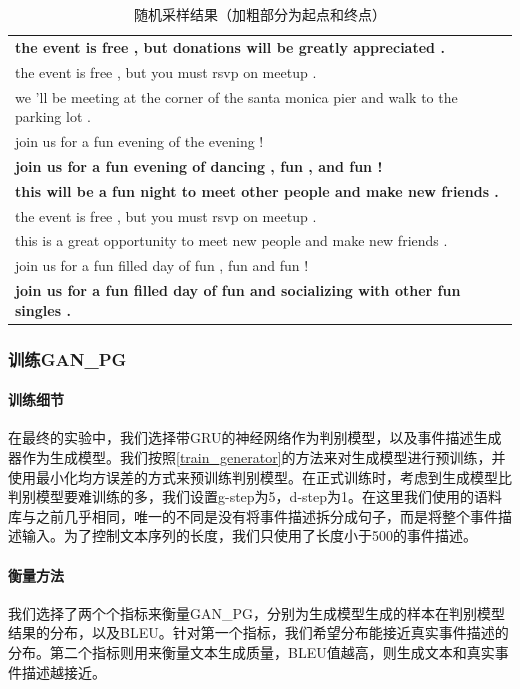 \begin{table}[htbp]
    \center
    \caption{\label{t3-3}随机采样结果（加粗部分为起点和终点）}
    \begin{tabular*}{\linewidth}{p{\linewidth}}
\toprule
\textbf{the event is free , but donations will be greatly appreciated .}\\
the event is free , but you must rsvp on meetup . \\
we 'll be meeting at the corner of the santa monica pier and walk to the parking lot .\\
join us for a fun evening of the evening !\\
\textbf{join us for a fun evening of dancing , fun , and fun !}\\
\midrule
\textbf{this will be a fun night to meet other people and make new friends .}\\
the event is free , but you must rsvp on meetup . \\
this is a great opportunity to meet new people and make new friends .\\
join us for a fun filled day of fun , fun and fun ! \\
\textbf{join us for a fun filled day of fun and socializing with other fun singles . }\\
\bottomrule
    \end{tabular*}
\end{table}

\subsubsection{训练GAN\_PG}
\paragraph{训练细节}
在最终的实验中，我们选择带GRU的神经网络作为判别模型，以及事件描述生成器作为生成模型。我们按照\ref{train_generator}的方法来对生成模型进行预训练，并使用最小化均方误差的方式来预训练判别模型。在正式训练时，考虑到生成模型比判别模型要难训练的多，我们设置g-step为5，d-step为1。在这里我们使用的语料库与之前几乎相同，唯一的不同是没有将事件描述拆分成句子，而是将整个事件描述输入。为了控制文本序列的长度，我们只使用了长度小于500的事件描述。
\paragraph{衡量方法}
我们选择了两个个指标来衡量GAN\_PG，分别为生成模型生成的样本在判别模型结果的分布，以及BLEU\cite{papineni_bleu:_2002}。针对第一个指标，我们希望分布能接近真实事件描述的分布。第二个指标则用来衡量文本生成质量，BLEU值越高，则生成文本和真实事件描述越接近。
